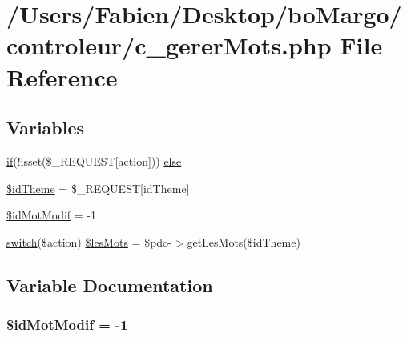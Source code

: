 \hypertarget{c__gerer_mots_8php}{}\section{/\+Users/\+Fabien/\+Desktop/bo\+Margo/controleur/c\+\_\+gerer\+Mots.php File Reference}
\label{c__gerer_mots_8php}
\subsection*{Variables}
\begin{DoxyCompactItemize}
\item 
\hyperlink{bootstrap_8min_8js_a87cf461060832b8b68a7b48d9e371e4f}{if}(!isset(\$\+\_\+\+R\+E\+Q\+U\+E\+S\+T\mbox{[}\textquotesingle{}action\textquotesingle{}\mbox{]})) \hyperlink{c__gerer_mots_8php_a9eb9d4aea63ebe6f016e561ea73b210a}{else}
\item 
\hyperlink{c__gerer_mots_8php_a15ce66af1239b15a9d86dcefa7372521}{\$id\+Theme} = \$\+\_\+\+R\+E\+Q\+U\+E\+S\+T\mbox{[}\textquotesingle{}id\+Theme\textquotesingle{}\mbox{]}
\item 
\hyperlink{c__gerer_mots_8php_a2f0b5f5b4ce22aa34d2e47075203da84}{\$id\+Mot\+Modif} = -\/1
\item 
\hyperlink{index_8php_a6160ae6d9a60bbcc19780fa9bc2c9b41}{switch}(\$action) \hyperlink{c__gerer_mots_8php_a1b34fbfde3a3b8a2b9ae5479a19d2e9b}{\$les\+Mots} = \$pdo-\/$>$get\+Les\+Mots(\$id\+Theme)
\end{DoxyCompactItemize}


\subsection{Variable Documentation}
\hypertarget{c__gerer_mots_8php_a2f0b5f5b4ce22aa34d2e47075203da84}{}
\subsubsection[{\$id\+Mot\+Modif}]{\setlength{\rightskip}{0pt plus 5cm}\$id\+Mot\+Modif = -\/1}\label{c__gerer_mots_8php_a2f0b5f5b4ce22aa34d2e47075203da84}
\hypertarget{c__gerer_mots_8php_a15ce66af1239b15a9d86dcefa7372521}{}
